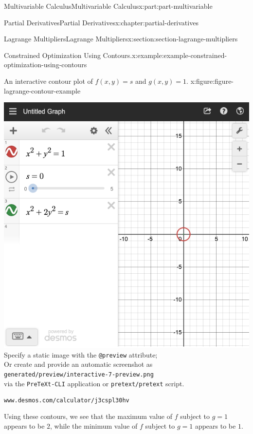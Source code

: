 \documentclass[twoside,10pt,]{tufte-book}
\newcommand{\mono}[1]{\texttt{#1}}
\numberwithin{equation}{part}
\newlength{\qrsize}
\newlength{\previewwidth}
\begin{document}
\begin{partptx}{Multivariable Calculus}{}{Multivariable Calculus}{}{}{x:part:part-multivariable}
\begin{chapterptx}{Partial Derivatives}{}{Partial Derivatives}{}{}{x:chapter:partial-derivatives}
\begin{sectionptx}{Lagrange Multipliers}{}{Lagrange Multipliers}{}{}{x:section:section-lagrange-multipliers}
\begin{example}{Constrained Optimization Using Contours.}{x:example:example-constrained-optimization-using-contours}
\begin{figureptx}{An interactive contour plot of \(f(x,y) = s\) and \(g(x,y) = 1\).%
}{x:figure:figure-lagrange-contour-example}{}
\begin{tcbraster}[raster columns=2, raster column skip=1pt, raster halign=center, raster force size=false, raster left skip=0pt, raster right skip=0pt]
\begin{tcolorbox}[previewstyle, width=\previewwidth]
{\includegraphics[width=0.80\linewidth,height=\qrsize,keepaspectratio]{generated/preview/interactive-7-preview.png}}%
{\small{}Specify a static image with the \mono{@preview} attribute;\\%
Or create and provide an automatic screenshot as\\%
\mono{generated/preview/interactive-7-preview.png}\\%
via the \mono{PreTeXt-CLI} application or \mono{pretext/pretext} script.}%
\end{tcolorbox}%
\begin{tcolorbox}[qrstyle]%
{\hypersetup{urlcolor=black}}%
\end{tcolorbox}%
\begin{tcolorbox}[captionstyle]%
\small \mono{www.desmos.com/calculator/j3cspl30hv}\end{tcolorbox}%
\end{tcbraster}%
\tcblower
\end{figureptx}%
Using these contours, we see that the maximum value of \(f\) subject to \(g = 1\) appears to be \(2\), while the minimum value of \(f\) subject to \(g=1\) appears to be \(1\).%
\end{example}

\end{sectionptx}
\end{chapterptx}
\end{partptx}
\end{document}
